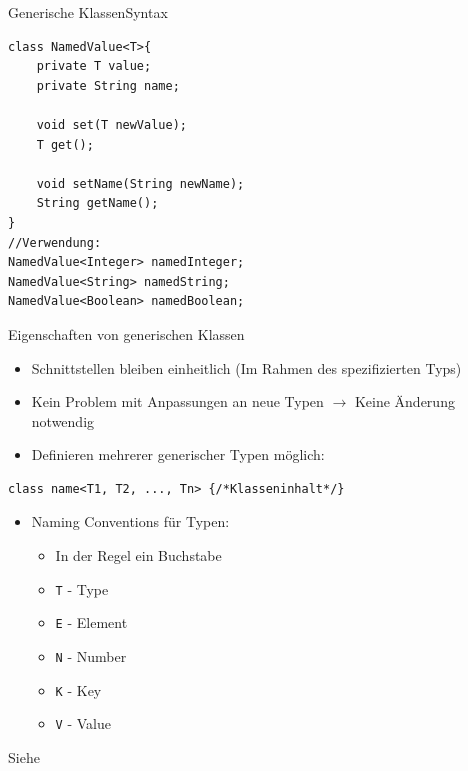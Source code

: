 \begin{frame}[fragile]{Generische Klassen}{Syntax}
\lstset{style=java}
\begin{lstlisting}
class NamedValue<T>{
    private T value;
    private String name;
    
    void set(T newValue);
    T get();
    
    void setName(String newName);
    String getName();
}
//Verwendung:
NamedValue<Integer> namedInteger;
NamedValue<String> namedString;
NamedValue<Boolean> namedBoolean;
\end{lstlisting}
\end{frame}

\begin{frame}{Eigenschaften von generischen Klassen}
\begin{itemize}
    \item Schnittstellen bleiben einheitlich (Im Rahmen des spezifizierten Typs)
    \item Kein Problem mit Anpassungen an neue Typen $\rightarrow$ Keine Änderung notwendig
    \item Definieren mehrerer generischer Typen möglich:
\end{itemize}%
\lstset{style=java}%
\begin{lstlisting}
class name<T1, T2, ..., Tn> {/*Klasseninhalt*/}
\end{lstlisting}
\framebreak
\begin{itemize}
\item Naming Conventions für Typen:
    \begin{itemize}
        \item In der Regel ein Buchstabe
        \item \texttt{T} - Type
        \item \texttt{E} - Element
        \item \texttt{N} - Number
        \item \texttt{K} - Key
        \item \texttt{V} - Value
    \end{itemize}
\end{itemize}
Siehe \cite{orac:generics}
\end{frame}

